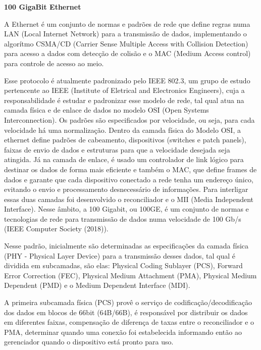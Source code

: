 \documentclass[a4paper,12pt]{article}
\begin{document}
\begin{center}
\textbf{{\LARGE 100 GigaBit Ethernet}} \\ \vspace{0.5cm}
\end{center}

A Ethernet é um conjunto de normas e padrões de rede que define regras numa LAN (Local Internet Network) para a transmissão de dados, implementando o algorítmo CSMA/CD (Carrier Sense Multiple Access with Collision Detection) para acesso a dados com detecção de colisão e o MAC (Medium Access control) para controle de acesso ao meio.

Esse protocolo é atualmente padronizado pelo IEEE 802.3, um grupo de estudo pertencente ao IEEE (Institute of Eletrical and Electronics Engineers), cuja a responsabilidade é estudar e padronizar esse modelo de rede, tal qual atua na camada física e de enlace de dados no modelo OSI (Open Systems Interconnection). Os padrões são especificados por velocidade, ou seja, para cada velocidade há uma normalização.
Dentro da camada física do Modelo OSI, a ethernet define padrões de cabeamento, dispositivos (switches e patch panels), faixas de envio de dados e estruturas para que a velocidade desejada seja atingida.
Já na camada de enlace, é usado um controlador de link lógico para destinar os dados de forma mais eficiente e também o MAC, que define frames de dados e garante que cada dispositivo conectado a rede tenha um endereço único, evitando o envio e processamento desnecessário de informações.
Para interligar essas duas camadas foi desenvolvido o reconciliador e o MII (Media Independent Interface).
Nesse âmbito, a 100 Gigabit, ou 100GE, é um conjunto de normas e tecnologias de rede para transmissão de dados numa velocidade de 100 Gb/s (IEEE Computer Society (2018)).


Nesse padrão, inicialmente são determinadas as especificações da camada física (PHY - Physical Layer Device) para a transmissão desses dados, tal qual é dividida em subcamadas, são elas: Physical Coding Sublayer (PCS), Forward Error Correction (FEC), Physical Medium Attachment (PMA), Physical Medium Dependent (PMD) e o Medium Dependent Interface (MDI).

A primeira subcamada física (PCS) provê o serviço de codificação/decodificação dos dados em blocos de 66bit (64B/66B), é responsável por distribuir os dados em diferentes faixas, compensação de diferença de taxas entre o reconciliador e o PMA, determinar quando uma conexão foi estabelecida informando então ao gerenciador quando o dispositivo está pronto para uso. 
\end{document}
